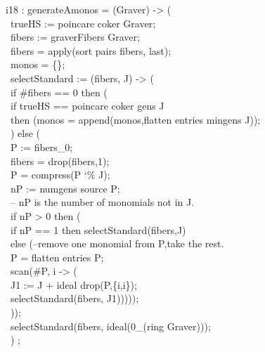 \beginOutput
i18 : generateAmonos = (Graver) -> (\\
\           trueHS := poincare coker Graver;\\
\           fibers := graverFibers Graver;\\
\           fibers = apply(sort pairs fibers, last);\\
\           monos = \{\};\\
\           selectStandard := (fibers, J) -> (\\
\           if #fibers == 0 then (\\
\              if trueHS == poincare coker gens J\\
\              then (monos = append(monos,flatten entries mingens J));\\
\           ) else (\\
\              P := fibers_0;\\
\              fibers = drop(fibers,1);\\
\              P = compress(P {\char`\%} J);\\
\              nP := numgens source P; \\
\              -- nP is the number of monomials not in J.\\
\              if nP > 0 then (\\
\                 if nP == 1 then selectStandard(fibers,J)\\
\                 else (--remove one monomial from P,take the rest.\\
\                       P = flatten entries P;\\
\                       scan(#P, i -> (\\
\                            J1 := J + ideal drop(P,\{i,i\});\\
\                            selectStandard(fibers, J1)))));\\
\           ));\\
\           selectStandard(fibers, ideal(0_(ring Graver)));\\
\           ) ; \\
\endOutput


